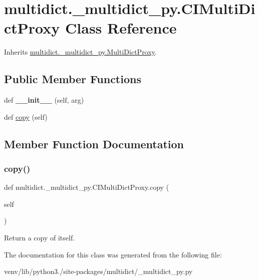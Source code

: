 \hypertarget{classmultidict_1_1__multidict__py_1_1_c_i_multi_dict_proxy}{}\section{multidict.\+\_\+multidict\+\_\+py.\+C\+I\+Multi\+Dict\+Proxy Class Reference}
\label{classmultidict_1_1__multidict__py_1_1_c_i_multi_dict_proxy}


Inherits \hyperlink{classmultidict_1_1__multidict__py_1_1_multi_dict_proxy}{multidict.\+\_\+multidict\+\_\+py.\+Multi\+Dict\+Proxy}.

\subsection*{Public Member Functions}
\begin{DoxyCompactItemize}
\item 
\mbox{\label{classmultidict_1_1__multidict__py_1_1_c_i_multi_dict_proxy_a28f472bf9945c1e4549971259d9987ed}} 
def {\bfseries \+\_\+\+\_\+init\+\_\+\+\_\+} (self, arg)
\item 
def \hyperlink{classmultidict_1_1__multidict__py_1_1_c_i_multi_dict_proxy_a176586d9814577aaea6bde96a33571f4}{copy} (self)
\end{DoxyCompactItemize}


\subsection{Member Function Documentation}
\mbox{\label{classmultidict_1_1__multidict__py_1_1_c_i_multi_dict_proxy_a176586d9814577aaea6bde96a33571f4}} 
\subsubsection{\texorpdfstring{copy()}{copy()}}
{\footnotesize\ttfamily def multidict.\+\_\+multidict\+\_\+py.\+C\+I\+Multi\+Dict\+Proxy.\+copy (\begin{DoxyParamCaption}\item[{}]{self }\end{DoxyParamCaption})}

\begin{DoxyVerb}Return a copy of itself.\end{DoxyVerb}
 

The documentation for this class was generated from the following file\+:\begin{DoxyCompactItemize}
\item 
venv/lib/python3./site-\/packages/multidict/\+\_\+multidict\+\_\+py.\+py\end{DoxyCompactItemize}
